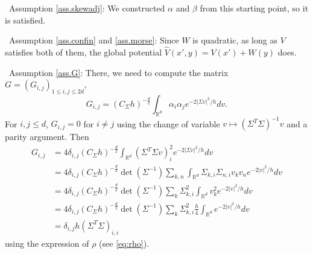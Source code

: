 \documentclass[12pt]{amsart}
\newcommand{\R}{\mathbb R}
\numberwithin{equation}{section}
\numberwithin{figure}{section}
\begin{document}
\textbullet\ Assumption \ref{ass.skewadj}: We constructed $\alpha$ and $\beta$ from this starting point, so it is satisfied.

\textbullet\ Assumption \ref{ass.confin} and \ref{ass.morse}: Since $W$ is quadratic, as long as $V$ satisfies both of them, the global potential $\hat V(x',y) = V(x') + W(y)$ does.

\textbullet\ Assumption \ref{ass.G}: There, we need to compute the matrix $G = (G_{i,j})_{1\leq i,j\leq 2d}$,
\begin{equation*}
G_{i,j} = (C_\Sigma h)^{-\frac d2}\int_{\R^d}\alpha_i\alpha_je^{-2|\Sigma v|^2/h}dv.
\end{equation*}
For $i,j\leq d$, $G_{i,j} = 0$ for $i\neq j$ using the change of variable $v\mapsto(\Sigma^T\Sigma)^{-1} v$ and a parity argument. %
Then
\begin{equation*}
\begin{aligned}
    G_{i,j} &= 4\delta_{i,j}(C_\Sigma h)^{-\frac d2}\int_{\R^d}(\Sigma^T\Sigma v)_i^2e^{-2|\Sigma v|^2/h}dv\\
    &= 4\delta_{i,j}(C_\Sigma h)^{-\frac d2}\det(\Sigma^{-1})\sum_{k,n}\int_{\R^d}\Sigma_{k,i}\Sigma_{n,i}v_kv_ne^{-2|v|^2/h}dv\\
    &= 4\delta_{i,j}(C_\Sigma h)^{-\frac d2}\det(\Sigma^{-1})\sum_{k}\Sigma_{k,i}^2\int_{\R^d}v_k^2e^{-2|v|^2/h}dv\\
    &= 4\delta_{i,j}(C_\Sigma h)^{-\frac d2}\det(\Sigma^{-1})\sum_{k}\Sigma_{k,i}^2\frac h4\int_{\R^d}e^{-2|v|^2/h}dv\\
    &= \delta_{i,j}h(\Sigma^T\Sigma)_{i,i}
\end{aligned}
\end{equation*}
using %
the expression of $\rho$ (see \eqref{eq:rho}).
\end{document}
